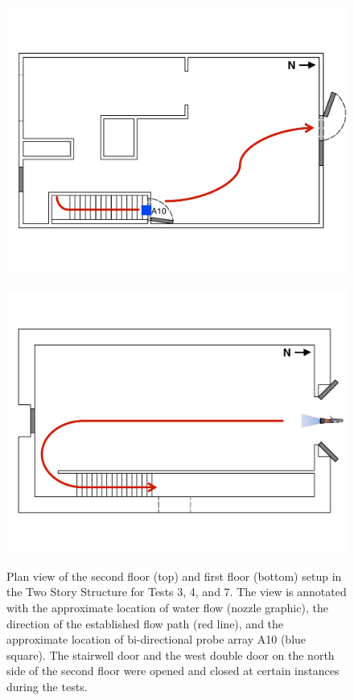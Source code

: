 \documentclass[12pt,oneside]{book}
\begin{document}
\begin{figure}[!ht]
	\includegraphics[width=\columnwidth]{../Figures/Floor_Plans/Specific_Tests/West_Hose_Test_2nd_Floor_Annotated}
	\\~\\
	\includegraphics[width=\columnwidth]{../Figures/Floor_Plans/Specific_Tests/West_Hose_Test_19_1st_Floor_Annotated}
	\caption[Plan view of the Two Story Structure setup for Tests 3 and 7.]{Plan view of the second floor (top) and first floor (bottom) setup in the Two Story Structure for Tests 3, 4, and 7. The view is annotated with the approximate location of water flow (nozzle graphic), the direction of the established flow path (red line), and the approximate location of bi-directional probe array A10 (blue square). The stairwell door and the west double door on the north side of the second floor were opened and closed at certain instances during the tests.}
	\label{fig:flow_path_2}
\end{figure}
\FloatBarrier
\end{document}
